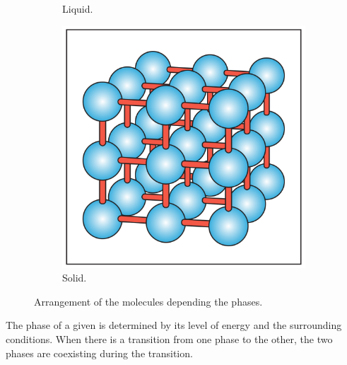 \begin{figure}[h]
\begin{subfigure}[b]{0.3\textwidth}
         \caption{Liquid.}
         \label{fig:C2_liq}
     \end{subfigure}
     \begin{subfigure}[b]{0.3\textwidth}
         \centering
         \includegraphics[width=\textwidth]{Chapitre_2/Images/solid.png}
         \caption{Solid.}
         \label{fig:C2_sol}
     \end{subfigure}
        \caption{Arrangement of the molecules depending the phases\cite{Boles2006}.}
        \label{fig:C2_phase}
\end{figure}

The phase of a given is determined by its level of energy and the surrounding conditions. When there is a transition from one phase to the other, the two phases are coexisting during the transition.
